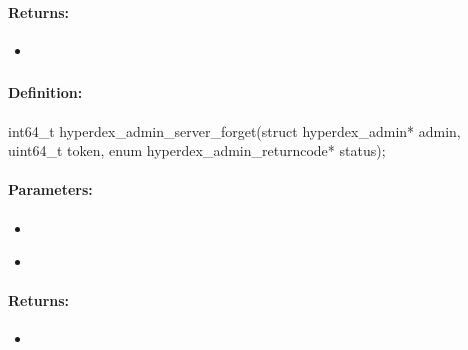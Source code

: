 \paragraph{Returns:}
\begin{itemize}[noitemsep]
\item {}\\

\end{itemize}

\pagebreak
\subsubsection{}
\label{api:c:server_forget}


\paragraph{Definition:}
\begin{ccode}
int64_t hyperdex_admin_server_forget(struct hyperdex_admin* admin,
        uint64_t token,
        enum hyperdex_admin_returncode* status);
\end{ccode}

\paragraph{Parameters:}
\begin{itemize}[noitemsep]
\item {}\\

\item {}\\

\end{itemize}

\paragraph{Returns:}
\begin{itemize}[noitemsep]
\item {}\\

\end{itemize}

